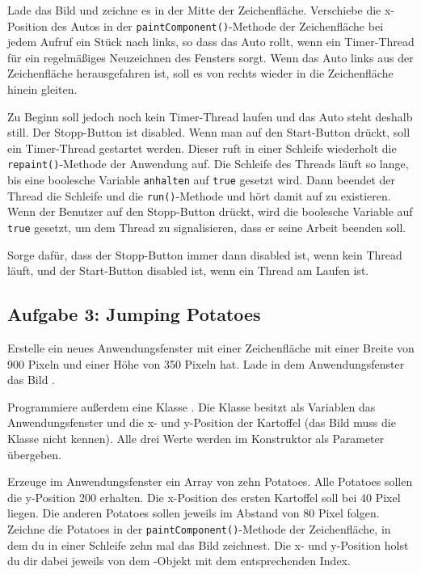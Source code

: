 Lade das Bild  und zeichne es in der Mitte der Zeichenfläche.
Verschiebe die x-Position des Autos in der \lstinline|paintComponent()|-Methode
der Zeichenfläche bei jedem Aufruf ein Stück nach links, so dass das Auto
rollt, wenn ein Timer-Thread für ein regelmäßiges Neuzeichnen des Fensters
sorgt. Wenn das Auto links aus der Zeichenfläche herausgefahren ist, soll es
von rechts wieder in die Zeichenfläche hinein gleiten.

Zu Beginn soll jedoch noch kein Timer-Thread laufen und das Auto steht deshalb
still. Der Stopp-Button ist disabled. Wenn man auf den Start-Button drückt,
soll ein Timer-Thread gestartet werden. Dieser ruft in einer Schleife
wiederholt die \lstinline|repaint()|-Methode der Anwendung auf. Die Schleife des
Threads läuft so lange, bis eine boolesche Variable \lstinline|anhalten| auf
\lstinline|true| gesetzt wird. Dann beendet der Thread die Schleife und die
\lstinline|run()|-Methode und hört damit auf zu existieren. Wenn der Benutzer
auf den Stopp-Button drückt, wird die boolesche Variable auf \lstinline|true|
gesetzt, um dem Thread zu signalisieren, dass er seine Arbeit beenden soll.

Sorge dafür, dass der Stopp-Button immer dann disabled ist, wenn kein Thread
läuft, und der Start-Button disabled ist, wenn ein Thread am Laufen ist.


\subsection{Aufgabe 3: Jumping Potatoes}

Erstelle ein neues Anwendungsfenster mit einer Zeichenfläche mit einer Breite
von 900 Pixeln und einer Höhe von 350 Pixeln hat. Lade in dem Anwendungsfenster
das Bild .

Programmiere außerdem eine Klasse . Die Klasse besitzt als
Variablen das Anwendungsfenster und die x- und y-Position der Kartoffel (das
Bild muss die Klasse nicht kennen). Alle drei Werte werden im Konstruktor als
Parameter übergeben.

Erzeuge im Anwendungsfenster ein Array von zehn Potatoes. Alle Potatoes sollen
die y-Position 200 erhalten. Die x-Position des ersten Kartoffel soll bei 40
Pixel liegen. Die anderen Potatoes sollen jeweils im Abstand von 80 Pixel
folgen. Zeichne die Potatoes in der \lstinline|paintComponent()|-Methode der
Zeichenfläche, in dem du in einer Schleife zehn mal das Bild zeichnest. Die x-
und y-Position holst du dir dabei jeweils von dem -Objekt mit
dem entsprechenden Index.

